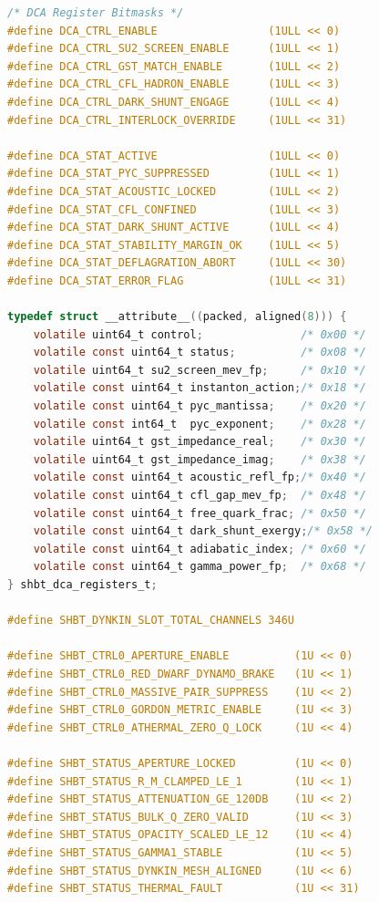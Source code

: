 \documentclass[11pt,onecolumn]{article}
\begin{document}
\begin{lstlisting}[language=C,caption={The normative freestanding C11 hardware MMIO and hyper-frame header (\texttt{include/shbt\_swarm\_mmio.h} v15.0).},label={lst:shbt_swarm_mmio}]
/* DCA Register Bitmasks */
#define DCA_CTRL_ENABLE                 (1ULL << 0)
#define DCA_CTRL_SU2_SCREEN_ENABLE      (1ULL << 1)
#define DCA_CTRL_GST_MATCH_ENABLE       (1ULL << 2)
#define DCA_CTRL_CFL_HADRON_ENABLE      (1ULL << 3)
#define DCA_CTRL_DARK_SHUNT_ENGAGE      (1ULL << 4)
#define DCA_CTRL_INTERLOCK_OVERRIDE     (1ULL << 31)

#define DCA_STAT_ACTIVE                 (1ULL << 0)
#define DCA_STAT_PYC_SUPPRESSED         (1ULL << 1)
#define DCA_STAT_ACOUSTIC_LOCKED        (1ULL << 2)
#define DCA_STAT_CFL_CONFINED           (1ULL << 3)
#define DCA_STAT_DARK_SHUNT_ACTIVE      (1ULL << 4)
#define DCA_STAT_STABILITY_MARGIN_OK    (1ULL << 5)
#define DCA_STAT_DEFLAGRATION_ABORT     (1ULL << 30)
#define DCA_STAT_ERROR_FLAG             (1ULL << 31)

typedef struct __attribute__((packed, aligned(8))) {
    volatile uint64_t control;               /* 0x00 */
    volatile const uint64_t status;          /* 0x08 */
    volatile uint64_t su2_screen_mev_fp;     /* 0x10 */
    volatile const uint64_t instanton_action;/* 0x18 */
    volatile const uint64_t pyc_mantissa;    /* 0x20 */
    volatile const int64_t  pyc_exponent;    /* 0x28 */
    volatile uint64_t gst_impedance_real;    /* 0x30 */
    volatile uint64_t gst_impedance_imag;    /* 0x38 */
    volatile const uint64_t acoustic_refl_fp;/* 0x40 */
    volatile const uint64_t cfl_gap_mev_fp;  /* 0x48 */
    volatile const uint64_t free_quark_frac; /* 0x50 */
    volatile const uint64_t dark_shunt_exergy;/* 0x58 */
    volatile const uint64_t adiabatic_index; /* 0x60 */
    volatile const uint64_t gamma_power_fp;  /* 0x68 */
} shbt_dca_registers_t;

#define SHBT_DYNKIN_SLOT_TOTAL_CHANNELS 346U

#define SHBT_CTRL0_APERTURE_ENABLE          (1U << 0)
#define SHBT_CTRL0_RED_DWARF_DYNAMO_BRAKE   (1U << 1)
#define SHBT_CTRL0_MASSIVE_PAIR_SUPPRESS    (1U << 2)
#define SHBT_CTRL0_GORDON_METRIC_ENABLE     (1U << 3)
#define SHBT_CTRL0_ATHERMAL_ZERO_Q_LOCK     (1U << 4)

#define SHBT_STATUS_APERTURE_LOCKED         (1U << 0)
#define SHBT_STATUS_R_M_CLAMPED_LE_1        (1U << 1)
#define SHBT_STATUS_ATTENUATION_GE_120DB    (1U << 2)
#define SHBT_STATUS_BULK_Q_ZERO_VALID       (1U << 3)
#define SHBT_STATUS_OPACITY_SCALED_LE_12    (1U << 4)
#define SHBT_STATUS_GAMMA1_STABLE           (1U << 5)
#define SHBT_STATUS_DYNKIN_MESH_ALIGNED     (1U << 6)
#define SHBT_STATUS_THERMAL_FAULT           (1U << 31)


\end{lstlisting}
\end{document}
